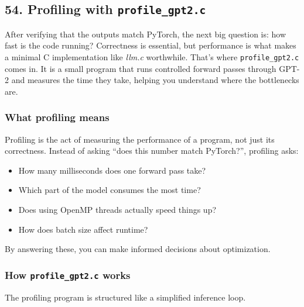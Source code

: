 \documentclass[
  letterpaper,
  DIV=11,
  numbers=noendperiod]{scrreprt}
\providecommand{\tightlist}{%
  \setlength{\itemsep}{0pt}\setlength{\parskip}{0pt}}
\begin{document}
\subsection{\texorpdfstring{54. Profiling with
\texttt{profile\_gpt2.c}}{54. Profiling with profile\_gpt2.c}}\label{profiling-with-profile_gpt2.c}

After verifying that the outputs match PyTorch, the next big question
is: how fast is the code running? Correctness is essential, but
performance is what makes a minimal C implementation like \emph{llm.c}
worthwhile. That's where \texttt{profile\_gpt2.c} comes in. It is a
small program that runs controlled forward passes through GPT-2 and
measures the time they take, helping you understand where the
bottlenecks are.

\subsubsection{What profiling means}\label{what-profiling-means}

Profiling is the act of measuring the performance of a program, not just
its correctness. Instead of asking ``does this number match PyTorch?'',
profiling asks:

\begin{itemize}
\tightlist
\item
  How many milliseconds does one forward pass take?
\item
  Which part of the model consumes the most time?
\item
  Does using OpenMP threads actually speed things up?
\item
  How does batch size affect runtime?
\end{itemize}

By answering these, you can make informed decisions about optimization.

\subsubsection{\texorpdfstring{How \texttt{profile\_gpt2.c}
works}{How profile\_gpt2.c works}}\label{how-profile_gpt2.c-works}

The profiling program is structured like a simplified inference loop.
\end{document}
